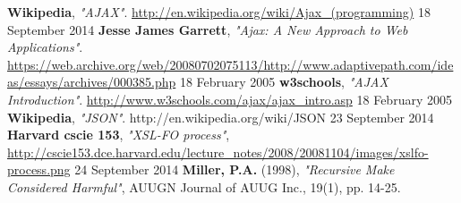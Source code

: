 \begin{thebibliography}{9}

   \textbf{Wikipedia},
   \emph{"AJAX"}.
   \url{http://en.wikipedia.org/wiki/Ajax\_(programming)}
   18 September 2014 
   \textbf{Jesse James Garrett},
   \emph{"Ajax: A New Approach to Web Applications"}.
   \url{https://web.archive.org/web/20080702075113/http://www.adaptivepath.com/ideas/essays/archives/000385.php}
   18 February 2005
   \textbf{w3schools},
   \emph{"AJAX Introduction"}.
   \url{http://www.w3schools.com/ajax/ajax\_intro.asp}
   18 February 2005
   \textbf{Wikipedia},
   \emph{"JSON"}.
   http://en.wikipedia.org/wiki/JSON
   23 September 2014
  \textbf{Harvard cscie 153},
  \emph{"XSL-FO process"},
  \url{http://cscie153.dce.harvard.edu/lecture\_notes/2008/20081104/images/xslfo-process.png}
  24 September 2014
  \textbf{Miller, P.A.} (1998), 
  \emph{"Recursive Make Considered Harmful"},
  AUUGN Journal of AUUG Inc., 19(1), pp. 14-25.
\end{thebibliography}
